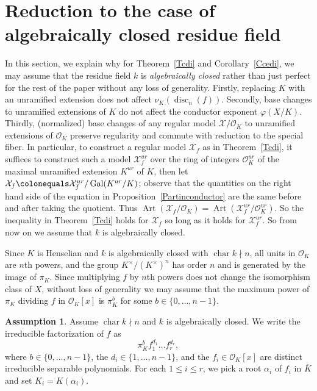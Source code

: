 \documentclass[12pt]{amsart}
\numberwithin{equation}{section}
\theoremstyle{definition}
\newtheorem{assumption}[equation]{Assumption}
\newcommand{\ol}[1]{\overline{#1}}
\newcommand{\mc}[1]{\mathcal{#1}}
\renewcommand{\O}{\mathcal{O}}
\renewcommand{\phi}{\varphi}
\DeclareMathOperator{\Gal}{Gal}
\DeclareMathOperator{\disc}{disc}
\DeclareMathOperator{\cha}{char}
\DeclareMathOperator{\Art}{Art}
\DeclareMathOperator{\chara}{char}
\begin{document}
\section{Reduction to the case of algebraically closed residue field}\label{Salgclosedreduction}
In this section, we explain why for Theorem~\ref{Tcdi} and Corollary~\ref{Ccedi}, we may assume that the residue field $k$ is \emph{algebraically
    closed} rather than just perfect for the rest of the paper without any loss of generality. Firstly,
 replacing $K$ with an unramified extension does not affect $\nu_K(\disc_n(f))$.  Secondly, base changes to unramified extensions of $K$ do not affect the conductor exponent $\phi(X/K)$.  Thirdly, (normalized) base changes of any regular model $\mc{X}/\mc{O}_K$ to 
  unramified extensions of $\mc{O}_K$ preserve regularity and
  commute with reduction to the special fiber.  In particular, to
  construct a regular model $\mc{X}_f$ as in Theorem~\ref{Tcdi}, it
  suffices to construct such a model $\mc{X}_f^{ur}$ over the ring of
  integers $\mc{O}_K^{ur}$ of the
  maximal unramified extension $K^{ur}$ of $K$, then let $\mc{X}_f \colonequals \mc{X}_f^{ur}/\Gal(K^{ur}/K)$; observe that the quantities on
  the right hand side of the equation in
  Proposition~\ref{Partinconductor} are the same before and after
  taking the quotient.   Thus $\Art(\mc{X}_f/\mc{O}_K) = \Art(\mc{X}_f^{ur}/\mc{O}_K^{ur})$.  So
  the inequality in Theorem~\ref{Tcdi} holds for $\mc{X}_f$ so long as
  it holds for $\mc{X}_f^{ur}$.  So from now on we assume that $k$ is algebraically closed.  



Since $K$ is Henselian and $k$ is algebraically closed with $\cha k \nmid n$, all units in $\mc{O}_K$ are $n$th powers, and the group $K^{\times}/(K^{\times})^n$ has
order $n$ and is
generated by the image of $\pi_K$.  Since multiplying $f$ by $n$th powers does not change the isomorphism class of $X$, without loss of generality we may assume that the maximum power of $\pi_K$ dividing $f$ in $\O_K[x]$ is $\pi_K^b$ for some $b
\in \{0, \ldots, n-1\}$.  

\begin{assumption}\label{Affactorization} Assume $\chara k \nmid n$ and $k$ is algebraically closed. We
write the irreducible factorization of $f$ as 
\begin{equation}\label{Effactorization}
  \pi_K^bf_1^{d_1} \ldots f_r^{d_r},
\end{equation}
where $b \in \{0,
\ldots, n-1\}$, the $d_i \in \{1, \ldots, n-1\}$, and the $f_i \in
\mc{O}_K[x]$ are distinct irreducible separable polynomials. For each $1 \leq i \leq
r$, we pick a root $\alpha_i$ of $f_i$ in $\ol{K}$ and set $K_i = K(\alpha_i)$.
\end{assumption}
\end{document}
